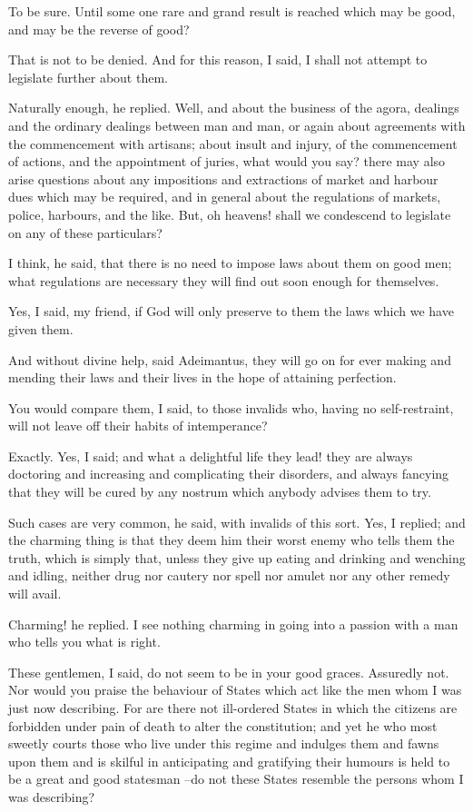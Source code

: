 To be sure.
Until some one rare and grand result is reached which may be good, and may be the reverse of good?

That is not to be denied.
And for this reason, I said, I shall not attempt to legislate further about them.

Naturally enough, he replied.
Well, and about the business of the agora, dealings and the ordinary dealings between man and man, or again about agreements with the commencement with artisans; about insult and injury, of the commencement of actions, and the appointment of juries, what would you say? there may also arise questions about any impositions and extractions of market and harbour dues which may be required, and in general about the regulations of markets, police, harbours, and the like. But, oh heavens! shall we condescend to legislate on any of these particulars?

I think, he said, that there is no need to impose laws about them on good men; what regulations are necessary they will find out soon enough for themselves.

Yes, I said, my friend, if God will only preserve to them the laws which we have given them.

And without divine help, said Adeimantus, they will go on for ever making and mending their laws and their lives in the hope of attaining perfection.

You would compare them, I said, to those invalids who, having no self-restraint, will not leave off their habits of intemperance?

Exactly.
Yes, I said; and what a delightful life they lead! they are always doctoring and increasing and complicating their disorders, and always fancying that they will be cured by any nostrum which anybody advises them to try.

Such cases are very common, he said, with invalids of this sort.
Yes, I replied; and the charming thing is that they deem him their worst enemy who tells them the truth, which is simply that, unless they give up eating and drinking and wenching and idling, neither drug nor cautery nor spell nor amulet nor any other remedy will avail.

Charming! he replied. I see nothing charming in going into a passion with a man who tells you what is right.

These gentlemen, I said, do not seem to be in your good graces.
Assuredly not.
Nor would you praise the behaviour of States which act like the men whom I was just now describing. For are there not ill-ordered States in which the citizens are forbidden under pain of death to alter the constitution; and yet he who most sweetly courts those who live under this regime and indulges them and fawns upon them and is skilful in anticipating and gratifying their humours is held to be a great and good statesman --do not these States resemble the persons whom I was describing?

